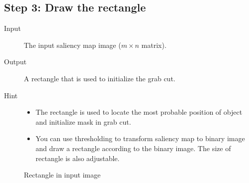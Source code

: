 \documentclass[12pt]{article}
\begin{document}
\subsection{Step 3: Draw the rectangle}

\begin{description} 
\item[Input] The input saliency map image ($m \times n$ matrix). 
\item[Output]  A rectangle that is used to initialize the grab cut. %
\item[Hint] 
\begin{itemize}
\item The rectangle is used to locate the most probable position of object and initialize mask in grab cut. 
\item You can use {\color{blue} thresholding} to transform saliency map to binary image and draw a rectangle according to the binary image. The {\color{blue} size of rectangle} is also adjustable.
\end{itemize}
\end{description}

\begin{figure}[!ht]
  \caption{Rectangle in input image}
  \label{fig: } %
\end{figure}
\end{document}
